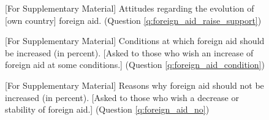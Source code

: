 \begin{figure}[h!]
  \caption[Attitudes on the evolution of foreign aid]{[For Supplementary Material] Attitudes regarding the evolution of [own country] foreign aid. (Question \ref{q:foreign_aid_raise_support})}\label{fig:foreign_aid_raise_support}
\end{figure}

\begin{figure}[h!]
  \caption[Conditions at which foreign aid should be increased]{[For Supplementary Material] Conditions at which foreign aid should be increased (in percent). [Asked to those who wish an increase of foreign aid at some conditions.] (Question \ref{q:foreign_aid_condition})}\label{fig:foreign_aid_condition}
\end{figure}

\begin{figure}[h!]
  \caption[Reasons why foreign aid should not be increased]{[For Supplementary Material] Reasons why foreign aid should not be increased (in percent). [Asked to those who wish a decrease or stability of foreign aid.] (Question \ref{q:foreign_aid_no})}\label{fig:foreign_aid_no}
\end{figure}

